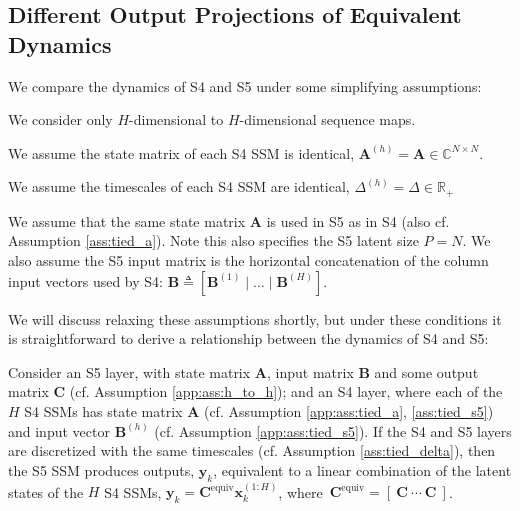 \subsection{Different Output Projections of Equivalent Dynamics}
\label{app:sec:equiv}
We compare the dynamics of S4 and S5 under some simplifying assumptions:

\begin{assumption}
\label{ass:h_to_h}
We consider only $H$-dimensional to $H$-dimensional sequence maps.
\end{assumption}

\begin{assumption}
\label{ass:tied_a}
We assume the state matrix of each S4 SSM is identical, $\mathbf{A}^{(h)} = \mathbf{A} \in \mathbb{C}^{N \times N}$.
\end{assumption}

\begin{assumption}
\label{ass:tied_delta}
We assume the timescales of each S4 SSM are identical, $\Delta^{(h)} = \Delta \in \mathbb{R}_+$
\end{assumption}

\begin{assumption}
\label{ass:tied_s5}
We assume that the same state matrix $\mathbf{A}$ is used in S5 as in S4 (also cf. Assumption \ref{ass:tied_a}).  Note this also specifies the S5 latent size $P=N$.  We also assume the S5 input matrix is the horizontal concatenation of the column input vectors used by S4: $\mathbf{B} \triangleq \left[ \mathbf{B}^{(1)} \mid \ldots \mid \mathbf{B}^{(H)} \right]$.
\end{assumption}

We will discuss relaxing these assumptions shortly, but under these conditions it is straightforward to derive a relationship between the dynamics of S4 and S5:

\begin{prop}
\label{prop:equiv}
Consider an S5 layer, with state matrix $\mathbf{A}$, input matrix $\mathbf{B}$ and some output matrix $\mathbf{C}$ (cf. Assumption \ref{app:ass:h_to_h}); and an S4 layer, where each of the $H$ S4 SSMs has state matrix $\mathbf{A}$ (cf. Assumption \ref{app:ass:tied_a}, \ref{ass:tied_s5}) and input vector $\mathbf{B}^{(h)}$ (cf. Assumption \ref{app:ass:tied_s5}).  If the S4 and S5 layers are discretized with the same timescales (cf. Assumption \ref{ass:tied_delta}), then the S5 SSM produces outputs, $\mathbf{y}_k$, equivalent to a linear combination of the latent states of the $H$ S4 SSMs, $\mathbf{y}_k = \mathbf{C}^{\mathrm{equiv}}\mathbf{x}_k^{(1:H)}$, where\ $\mathbf{C}^{\mathrm{equiv}} = \left[\ \mathbf{C}\ \cdots\ \mathbf{C}\ \right]$.
\end{prop}

